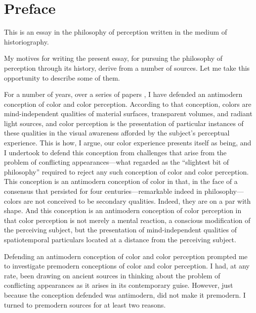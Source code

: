 \chapter*{Preface} %
\label{cha:preface}


This is an essay in the philosophy of perception written in the medium of historiography. 

My motives for writing the present essay, for pursuing the philosophy of perception through its history, derive from a number of sources. Let me take this opportunity to describe some of them.

For a number of years, over a series of papers \citep{Kalderon:2006tg,Kalderon:2008fk,Kalderon:2010fj,Kalderon:2007mr,Kalderon:2011fk}, I have defended an antimodern conception of color and color perception. According to that conception, colors are mind-independent qualities of material surfaces, transparent volumes, and radiant light sources, and color perception is the presentation of particular instances of these qualities in the visual awareness afforded by the subject's perceptual experience. This is how, I argue, our color experience presents itself as being, and I undertook to defend this conception from challenges that arise from the problem of conflicting appearances---what \citet{Hume:1748zr} regarded as the ``slightest bit of philosophy'' required to reject any such conception of color and color perception. This conception is an antimodern conception of color in that, in the face of a consensus that persisted for four centuries---remarkable indeed in philosophy---colors are not conceived to be secondary qualities. Indeed, they are on a par with shape. And this conception is an antimodern conception of color perception in that color perception is not merely a mental reaction, a conscious modification of the perceiving subject, but the presentation of mind-independent qualities of spatiotemporal particulars located at a distance from the perceiving subject. 

Defending an antimodern conception of color and color perception prompted me to investigate premodern conceptions of color and color perception. I had, at any rate, been drawing on ancient sources in thinking about the problem of conflicting appearances as it arises in its contemporary guise. However, just because the conception defended was antimodern, did not make it premodern. I turned to premodern sources for at least two reasons. 


